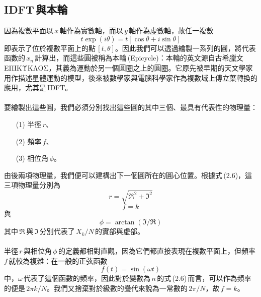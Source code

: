   \subsection{IDFT\,與本輪}
  因為複數平面以\,\(x\)\,軸作為實數軸，而以\,\(y\)\,軸作為虛數軸，故任一複數
  \[t\exp(i\theta)=t\left[\cos\theta+i\sin\theta\right]\]
  即表示了位於複數平面上的點\,\([t, \theta]\)。因此我們可以透過繪製一系列的圓，將代表函數的\,\(x_n\)\,計算出，而這些圓被稱為本輪\,(Epicycle)：本輪的英文源自古希臘文\,ΕΠΙΚΥΚΛΟΣ，其義為運動於另一個圓圈之上的圓圈。它原先被早期的天文學家用作描述星體運動的模型，後來被數學家與電腦科學家作為複數域上傅立葉轉換的應用，尤其是\,IDFT。
  \\\\
  要繪製出這些圓，我們必須分別找出這些圓的其中三個、最具有代表性的物理量：
  \begin{enumerate}
    \item[(1)]
    半徑\,\(r\)、

    \item[(2)]
    頻率\,\(f\)、

    \item[(3)]
    相位角\,\(\phi\)。
  \end{enumerate}
  \noindent 由後兩項物理量，我們便可以建構出下一個圓所在的圓心位置。根據式\,(2.6)，這三項物理量分別為
  \[r=\sqrt{\Re^2+\Im^2}\]
  \[f=k\]
  與
  \[\phi=\arctan(\Im/\Re)\]
  其中\,\(\Re\)\,與\,\(\Im\)\,分別代表了\,\(X_k/N\)\,的實部與虛部。
  \\\\
  半徑\,\(r\)\,與相位角\,\(\phi\)\,的定義都相對直觀，因為它們都直接表現在複數平面上，但頻率\,\(f\)\,就較為複雜：在一般的正弦函數
  \[f(t)=\sin(\omega t)\]
  中，\(\omega\)\,代表了這個函數的頻率，因此對於變數為\,\(n\)\,的式\,(2.6)\,而言，可以作為頻率的便是\,\(2\pi k/N\)。我們又捨棄對於級數的疊代來說為一常數的\,\(2\pi/N\)，故\,\(f=k\)。
